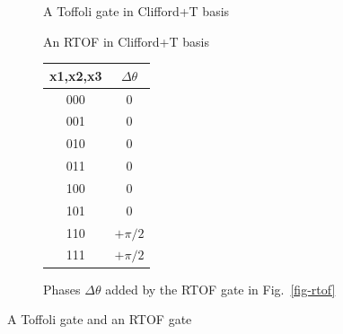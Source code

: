 \begin{figure}[t]
    \centering
    \begin{minipage}{0.55\textwidth}
        \begin{subfigure}[b][15mm]{0.9\textwidth}
            \centering
             
            \caption{A Toffoli gate in Clifford+T basis}
        \end{subfigure}
        
        \vspace{10mm}
        \begin{subfigure}[b][15mm]{0.9\textwidth}
            \centering
             
            \caption{An RTOF in Clifford+T basis}
        \end{subfigure}
    \end{minipage}
    \hspace{10mm}
    \begin{minipage}{0.35\textwidth}
    \vspace{10mm}
        \begin{subfigure}[b][30mm]{\textwidth}
        \centering
        \begin{tabular}{c|c}      
            \hline
            {x1,x2,x3} & $\Delta\theta$  \\  
            \hline
            000   & 0      \\
            001   & 0      \\
            010   & 0      \\
            011   & 0      \\
            100   & 0      \\
            101   & 0          \\
            110   & $+\pi/2$   \\
            111   & $+\pi/2$ \\
            \hline
        \end{tabular}
        \caption{Phases $\Delta\theta$ added by the RTOF gate in Fig.~\ref{fig-rtof}}
        \end{subfigure}
    \end{minipage}
    \caption{A Toffoli gate and an RTOF gate}
    \label{fig-tof-rtof}
\vspace{-5mm}
\end{figure}

        
